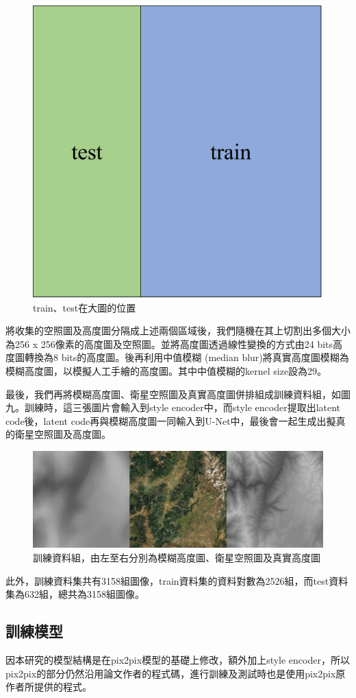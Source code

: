 \documentclass[a4paper, 12pt]{article}
\begin{document}
\begin{figure}[htbp]
    \centering
    \includegraphics[width=0.3\linewidth]{fig/9.jpg}
    \caption{train、test在大圖的位置}
    \label{fig:9}
\end{figure}

將收集的空照圖及高度圖分隔成上述兩個區域後，我們隨機在其上切割出多個大小為256 x 256像素的高度圖及空照圖。並將高度圖透過線性變換的方式由24 bits高度圖轉換為8 bits的高度圖。後再利用中值模糊 (median blur)將真實高度圖模糊為模糊高度圖，以模擬人工手繪的高度圖。其中中值模糊的kernel size設為29。

最後，我們再將模糊高度圖、衛星空照圖及真實高度圖併排組成訓練資料組，如圖九。訓練時，這三張圖片會輸入到style encoder中，而style encoder提取出latent code後，latent code再與模糊高度圖一同輸入到U-Net中，最後會一起生成出擬真的衛星空照圖及高度圖。

\begin{figure}[htbp]
    \centering
    \includegraphics[width=\linewidth]{fig/10.jpg}
    \caption{訓練資料組，由左至右分別為模糊高度圖、衛星空照圖及真實高度圖}
    \label{fig:10}
\end{figure}

此外，訓練資料集共有3158組圖像，train資料集的資料對數為2526組，而test資料集為632組，總共為3158組圖像。

\subsection{訓練模型}
因本研究的模型結構是在pix2pix模型的基礎上修改，額外加上style encoder，所以pix2pix的部分仍然沿用論文作者的程式碼，進行訓練及測試時也是使用pix2pix原作者所提供的程式。
\end{document}
